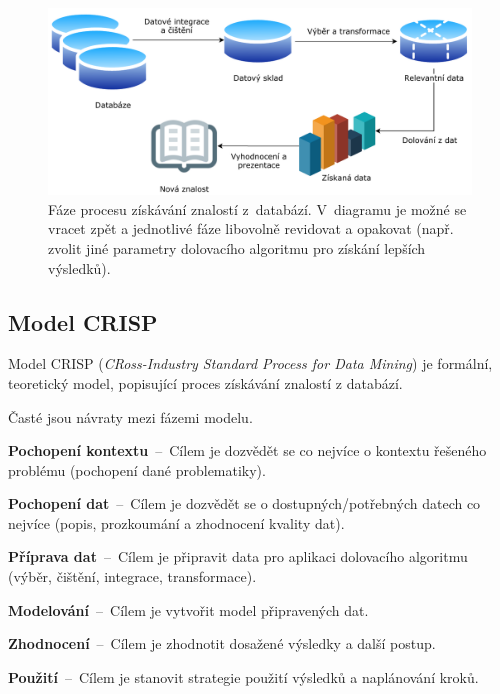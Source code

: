 \begin{figure}[H]
    \centering
    \includegraphics[width=1\linewidth]{knowledge_discovery_diagram.pdf}
    \caption{Fáze procesu získávání znalostí z~databází. V~diagramu je možné se vracet zpět a jednotlivé fáze libovolně revidovat a opakovat (např. zvolit jiné parametry dolovacího algoritmu pro získání lepších výsledků).}
\end{figure}

\subsection{Model CRISP}

\begin{compactitem}
    \item Model CRISP (\textit{CRoss-Industry Standard Process for Data Mining}) je formální, teoretický model, popisující proces získávání znalostí z databází.

    \item Časté jsou návraty mezi fázemi modelu.
\end{compactitem}

\begin{compactenum}
    \item \textbf{Pochopení kontextu}~--~Cílem je dozvědět se co nejvíce o kontextu řešeného problému (pochopení dané problematiky).

    \item \textbf{Pochopení dat}~--~Cílem je dozvědět se o dostupných/potřebných datech co nejvíce (popis, prozkoumání a zhodnocení kvality dat).

    \item \textbf{Příprava dat}~--~Cílem je připravit data pro aplikaci dolovacího algoritmu (výběr, čištění, integrace, transformace).

    \item \textbf{Modelování}~--~Cílem je vytvořit model připravených dat.

    \item \textbf{Zhodnocení}~--~Cílem je zhodnotit dosažené výsledky a další postup.

    \item \textbf{Použití}~--~Cílem je stanovit strategie použití výsledků a naplánování kroků.
\end{compactenum}


